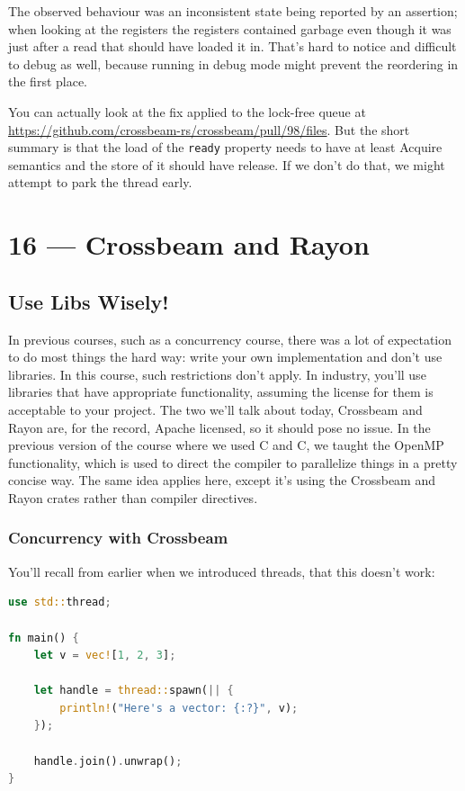 \documentclass[a4paper]{report}
\newcommand{\CPP}{C\nolinebreak\hspace{-.05em}\raisebox{.4ex}{\tiny\bf +}\nolinebreak\hspace{-.10em}\raisebox{.4ex}{\tiny\bf +}}
\def\CPP{{C\nolinebreak[4]\hspace{-.05em}\raisebox{.4ex}{\tiny\bf ++}}}
\begin{document}
The observed behaviour was an inconsistent state being reported by an assertion; when looking at the registers the registers contained garbage even though it was just after a read that should have loaded it in. That's hard to notice and difficult to debug as well, because running in debug mode might prevent the reordering in the first place.

You can actually look at the fix applied to the lock-free queue at \url{https://github.com/crossbeam-rs/crossbeam/pull/98/files}. But the short summary is that the load of the \texttt{ready} property needs to have at least Acquire semantics and the store of it should have release.  If we don't do that, we might attempt to park the thread early. 









\chapter*{16 --- Crossbeam and Rayon}


\section*{Use Libs Wisely!}
In previous courses, such as a concurrency course, there was a lot of expectation to do most things the hard way: write your own implementation and don't use libraries. In this course, such restrictions don't apply. In industry, you'll use libraries that have appropriate functionality, assuming the license for them is acceptable to your project. The two we'll talk about today, Crossbeam and Rayon are, for the record, Apache licensed, so it should pose no issue. In the previous version of the course where we used C and \CPP, we taught the OpenMP functionality, which is used to direct the compiler to parallelize things in a pretty concise way. The same idea applies here, except it's using the Crossbeam and Rayon crates rather than compiler directives.


\subsection*{Concurrency with Crossbeam} 

You'll recall from earlier when we introduced threads, that this doesn't work:
\begin{lstlisting}[language=Rust]
use std::thread;

fn main() {
    let v = vec![1, 2, 3];

    let handle = thread::spawn(|| {
        println!("Here's a vector: {:?}", v);
    });

    handle.join().unwrap();
}
\end{lstlisting}
\end{document}
